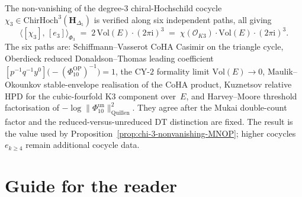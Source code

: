 \begin{remark}
\label{rem:v3-preface-chi3-six-paths}
The non-vanishing of the degree-$3$ chiral-Hochschild cocycle
$\chi_3 \in \mathrm{ChirHoch}^3(\mathbf H_{\Delta_5})$ is verified
along six independent paths, all giving
\[
 \bigl\langle [\chi_3],\, [e_3] \bigr\rangle_{\Phi_3}
 \;=\;
 2\,\mathrm{Vol}(E)\cdot (2\pi\mathrm{i})^3
 \;=\;
 \chi(\mathcal O_{K3})\cdot \mathrm{Vol}(E)\cdot (2\pi\mathrm{i})^3.
\]
The six paths are: Schiffmann--Vasserot CoHA Casimir on the triangle
cycle, Oberdieck reduced Donaldson--Thomas leading coefficient
$[p^{-1}q^{-1}y^0]\bigl(-(\Phi_{10}^{\mathrm{OP}})^{-1}\bigr)=1$, the CY-$2$ formality limit
$\mathrm{Vol}(E)\to0$, Maulik--Okounkov stable-envelope realisation of
the CoHA product, Kuznetsov relative HPD for the cubic-fourfold K3
component over~$E$, and Harvey--Moore threshold factorisation of
$-\log\|\Phi_{10}^{\mathrm{un}}\|^2_{\mathrm{Quillen}}$. They agree after the
Mukai double-count factor and the reduced-versus-unreduced DT
distinction are fixed. The result is the value used by
Proposition~\ref{prop:chi-3-nonvanishing-MNOP}; higher cocycles
$e_{k\ge4}$ remain additional cocycle data.
\end{remark}
\section{Guide for the reader}
\label{sec:guide}


